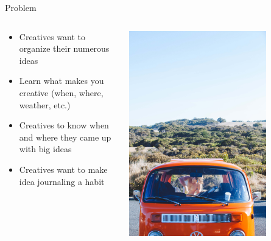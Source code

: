 \begin{frame}{Problem}
\begin{columns}
\begin{column}{0.5\textwidth}
\begin{itemize}
\item Creatives want to organize their numerous ideas
\item Learn what makes you creative (when, where, weather, etc.)
\item Creatives to know when and where they came up with big ideas
\item Creatives want to make idea journaling a habit
\end{itemize}
\end{column}
\begin{column}{0.5\textwidth}  %
    \begin{center}
     \includegraphics[width=0.75\textwidth]{img/VW}
     \end{center}
\end{column}
\end{columns}
\end{frame}

